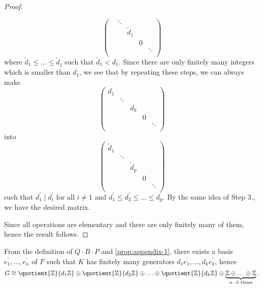 \begin{proof}
\begin{enumerate}
\[\begin{pmatrix}
					                 & \ddots &                    &   &        \\
					                 &        & \widetilde{d} _{j} &   &        \\
					                 &        &                    & 0 &        \\
					                 &        &                    &   & \ddots \\
				\end{pmatrix}
			\]
			where \(\widetilde{d} _1 \leq \ldots \leq \widetilde{d} _{j}  \) such that \(\widetilde{d} _1 < d_1\). Since there are only finitely many integers which is smaller than \(d_1\), we
			see that by repeating these steps, we can always make
			\[
				\begin{pmatrix}
					d_1 &        &       &   &        \\
					    & \ddots &       &   &        \\
					    &        & d_{k} &   &        \\
					    &        &       & 0 &        \\
					    &        &       &   & \ddots \\
				\end{pmatrix}
			\]
			into
			\[
				\begin{pmatrix}
					\widetilde{d} _1 &        &                    &   &        \\
					                 & \ddots &                    &   &        \\
					                 &        & \widetilde{d} _{p} &   &        \\
					                 &        &                    & 0 &        \\
					                 &        &                    &   & \ddots \\
				\end{pmatrix}
			\]
			such that \(d_1^\prime \mid d_i^\prime \) for all \(i \neq  1\) and \(d_1^\prime \leq d_2^\prime \leq \ldots \leq d_p^\prime  \). By the same idea of Step 3., we have the desired matrix.
	\end{enumerate}
	Since all operations are elementary and there are only finitely many of them, hence the result follows.
\end{proof}

From the definition of \(Q\cdot B\cdot P\) and \autoref{prop:appendix-1}, there exists a basis \(e_1^\prime, \ldots , e_{n} ^\prime  \) of \(F\) such
that \(K\) has finitely many generators \(d_1 e_1^\prime , \ldots , d_{k} e_{k} ^\prime\), hence
\[
	G\cong \quotient{\mathbb{\MakeUppercase{z}} }{d_1 \mathbb{\MakeUppercase{z}} } \oplus \quotient{\mathbb{\MakeUppercase{z}} }{d_2 \mathbb{\MakeUppercase{z}} } \oplus \ldots \oplus \quotient{\mathbb{\MakeUppercase{z}} }{d_k \mathbb{\MakeUppercase{z}} }  \oplus \underbrace{\mathbb{\MakeUppercase{z}} \oplus \ldots \oplus \mathbb{\MakeUppercase{z}}  }_{n-k \text{ times}}.
\]

